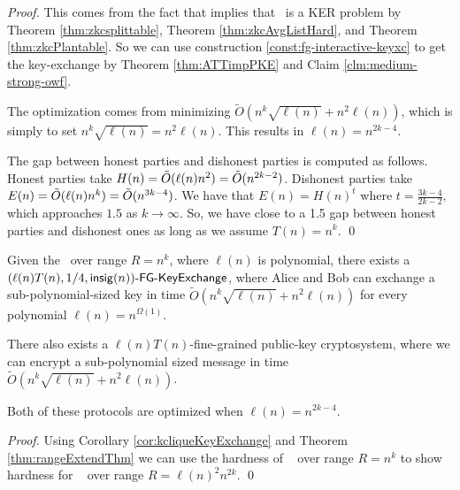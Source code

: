 \begin{proof}
	This comes from the fact that \strongzkc implies that \zkclique~is a KER problem by Theorem \ref{thm:zkcsplittable}, Theorem \ref{thm:zkcAvgListHard}, and Theorem \ref{thm:zkcPlantable}.  So we can use construction \ref{const:fg-interactive-keyxc} to get the key-exchange by Theorem \ref{thm:ATTimpPKE} and Claim \ref{clm:medium-strong-owf}. %
	
	The optimization comes from minimizing $\tilde{O}\left(n^{k}\sqrt{\ell(n)} + n^2\ell(n)\right)$, which is simply to set $n^k \sqrt{\ell(n)} = n^2 \ell(n)$. This results in $\ell(n) = n^{2k - 4}$.
	
	The gap between honest parties and dishonest parties is computed as follows. Honest parties take $H(n) = \~O(\ell(n)n^2) = \~O(n^{2k - 2})$. Dishonest parties take $E(n) = \~O(\ell(n)n^k) = \~O(n^{3k - 4})$. We have that $E(n) = H(n)^t$ where $t = \frac{3k-4}{2k-2}$, which approaches $1.5$ as $k \to \infty$. So, we have close to a 1.5 gap between honest parties and dishonest ones as long as we assume $T(n) = n^{k}$.
	\qed
\end{proof}

\begin{corollary}
	Given the \strongzkc~over range $R = n^{k}$, where $\ell(n)$ is polynomial, there exists a $\fgkeyxc{\ell(n)T(n)}{1/4}{\insig(n)}$, where Alice and Bob can exchange a sub-polynomial-sized key in time $\tilde{O}\left(n^{k}\sqrt{\ell(n)} + n^2\ell(n)\right)$ for every polynomial $\ell(n)= n ^{\Omega(1)}$.
	
	There also exists a $\ell(n)T(n)$-fine-grained public-key cryptosystem, where we can encrypt a sub-polynomial sized message in time $\tilde{O}\left(n^{k}\sqrt{\ell(n)} + n^2\ell(n)\right)$.
	
	Both of these protocols are optimized when $\ell(n) = n^{2k-4}$.
	\label{cor:kcliqueKeyExchangeRange}
\end{corollary}
\begin{proof}
	Using Corollary \ref{cor:kcliqueKeyExchange} and Theorem \ref{thm:rangeExtendThm} we can use the hardness of \strongzkc~ over range $R = n^{k}$ to show hardness for \strongzkc~ over range $R = \ell(n)^2n^{2k}$.
	\qed
\end{proof}
